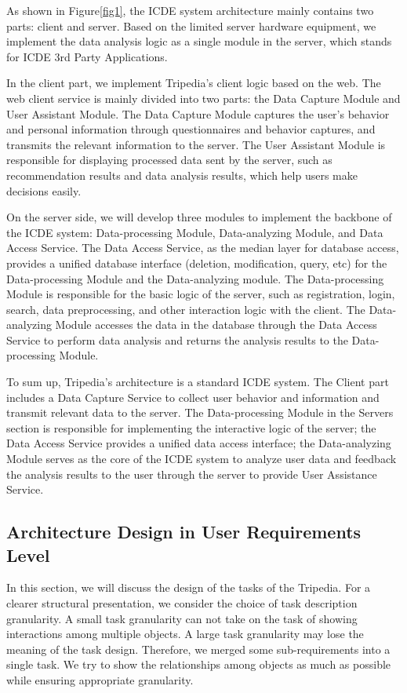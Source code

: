 \documentclass[conference]{IEEEtran}
\begin{document}
As shown in Figure\ref{fig1}, the ICDE system architecture mainly contains two parts: client and server. Based on the limited server hardware equipment, we implement the data analysis logic as a single module in the server, which stands for ICDE 3rd Party Applications. 

In the client part, we implement Tripedia's client logic based on the web. The web client service is mainly divided into two parts: the Data Capture Module and User Assistant Module. The Data Capture Module captures the user's behavior and personal information through questionnaires and behavior captures, and transmits the relevant information to the server. The User Assistant Module is responsible for displaying processed data sent by the server, such as recommendation results and data analysis results, which help users make decisions easily.

On the server side, we will develop three modules to implement the backbone of the ICDE system: Data-processing Module, Data-analyzing Module, and Data Access Service. The Data Access Service, as the median layer for database access, provides a unified database interface (deletion, modification, query, etc) for the Data-processing Module and the Data-analyzing module. The Data-processing Module is responsible for the basic logic of the server, such as registration, login, search, data preprocessing, and other interaction logic with the client. The Data-analyzing Module accesses the data in the database through the Data Access Service to perform data analysis and returns the analysis results to the Data-processing Module.

To sum up, Tripedia's architecture is a standard ICDE system. The Client part includes a Data Capture Service to collect user behavior and information and transmit relevant data to the server. The Data-processing Module in the Servers section is responsible for implementing the interactive logic of the server; the Data Access Service provides a unified data access interface; the Data-analyzing Module serves as the core of the ICDE system to analyze user data and feedback the analysis results to the user through the server to provide User Assistance Service.


\subsection{\textbf{Architecture Design in User Requirements Level}}

In this section, we will discuss the design of the tasks of the Tripedia. For a clearer structural presentation, we consider the choice of task description granularity. A small task granularity can not take on the task of showing interactions among multiple objects. A large task granularity may lose the meaning of the task design. Therefore, we merged some sub-requirements into a single task. We try to show the relationships among objects as much as possible while ensuring appropriate granularity. 
\end{document}
